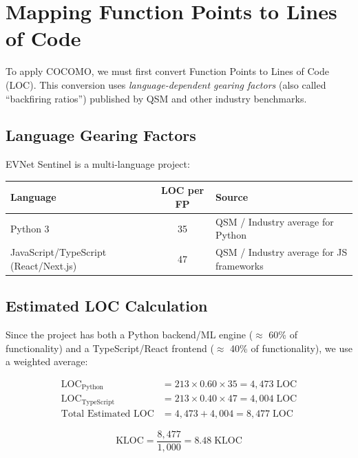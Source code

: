 \documentclass[11pt, a4paper]{article}
\begin{document}
\section{Mapping Function Points to Lines of Code}

To apply COCOMO, we must first convert Function Points to Lines of Code (LOC). This conversion uses \emph{language-dependent gearing factors} (also called ``backfiring ratios'') published by QSM and other industry benchmarks.

\subsection{Language Gearing Factors}

EVNet Sentinel is a multi-language project:

\begin{center}
\begin{tabular}{|l|c|l|}
\hline
\textbf{Language} & \textbf{LOC per FP} & \textbf{Source} \\ \hline
Python 3           & 35                  & QSM / Industry average for Python \\ \hline
JavaScript/TypeScript (React/Next.js) & 47 & QSM / Industry average for JS frameworks \\ \hline
\end{tabular}
\end{center}

\subsection{Estimated LOC Calculation}

Since the project has both a Python backend/ML engine ($\approx$ 60\% of functionality) and a TypeScript/React frontend ($\approx$ 40\% of functionality), we use a weighted average:

\begin{align}
\text{LOC}_{\text{Python}} &= 213 \times 0.60 \times 35 = 4{,}473 \;\text{LOC} \\[4pt]
\text{LOC}_{\text{TypeScript}} &= 213 \times 0.40 \times 47 = 4{,}004 \;\text{LOC} \\[6pt]
\text{Total Estimated LOC} &= 4{,}473 + 4{,}004 = \boxed{8{,}477 \;\text{LOC}}
\end{align}

$$\text{KLOC} = \frac{8{,}477}{1{,}000} = \boxed{8.48 \;\text{KLOC}}$$

\newpage
\end{document}
